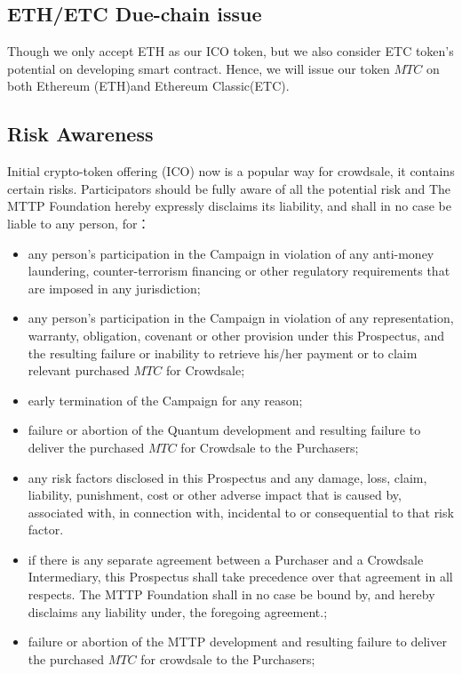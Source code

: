 \documentclass[UTF8,nofonts]{article}
\begin{document}
\begin{appendices}
\subsection{ETH/ETC Due-chain issue\label{sec: chains}}

Though we only accept ETH as our ICO token,  but we also consider ETC token's potential on developing smart contract. Hence,  we will issue our token $MTC$ on both Ethereum (ETH)and Ethereum Classic(ETC).


\subsection{Risk Awareness\label{sec: risks}}

Initial crypto-token offering (ICO) now is a popular way for crowdsale,  it contains certain risks. Participators should be fully aware of all the potential risk and The MTTP Foundation hereby expressly disclaims its liability,  and shall in no case be liable to any person,  for：
\begin{itemize}
 \item any person’s participation in the Campaign in violation of any anti-money laundering,  counter-terrorism financing or other regulatory requirements that are imposed in any jurisdiction;
 \item any person’s participation in the Campaign in violation of any representation, warranty,  obligation,  covenant or other provision under this Prospectus,  and the resulting failure or inability to retrieve his/her payment or to claim relevant purchased $MTC$ for Crowdsale;
 \item early termination of the Campaign for any reason;
 \item failure or abortion of the Quantum development and resulting failure to deliver the purchased $MTC$ for Crowdsale to the Purchasers;
 \item any risk factors disclosed in this Prospectus and any damage,  loss, claim, liability, punishment, cost or other adverse impact that is caused by, associated with, in connection with, incidental to or consequential to that risk factor.
 \item if there is any separate agreement between a Purchaser and a Crowdsale Intermediary,  this Prospectus shall take precedence over that agreement in all respects. The MTTP Foundation shall in no case be bound by,  and hereby disclaims any liability under,  the foregoing agreement.;
 \item failure or abortion of the MTTP development and resulting failure to deliver the purchased $MTC$ for crowdsale to the Purchasers;

\end{itemize}



\end{appendices}
\end{document}
